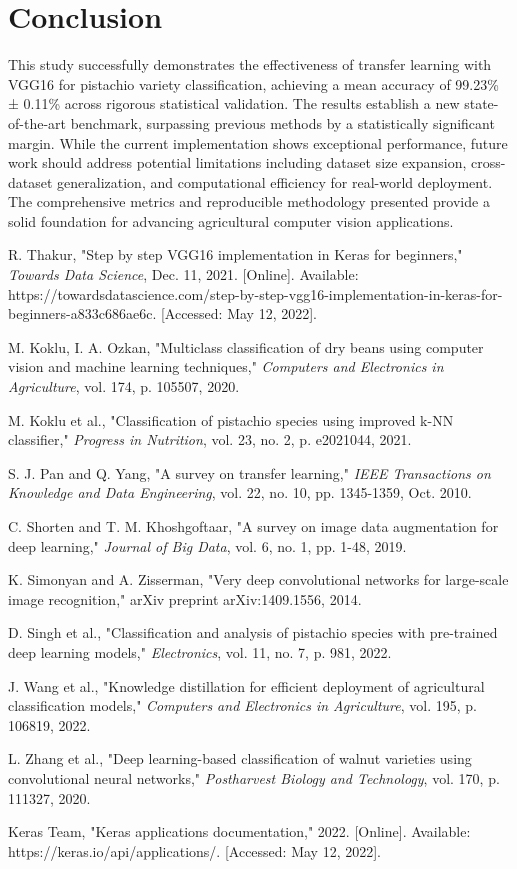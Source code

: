 \documentclass[conference]{IEEEtran}
\begin{document}
\section{Conclusion}
This study successfully demonstrates the effectiveness of transfer learning with VGG16 for pistachio variety classification, achieving a mean accuracy of 99.23\% ± 0.11\% across rigorous statistical validation. The results establish a new state-of-the-art benchmark, surpassing previous methods by a statistically significant margin. While the current implementation shows exceptional performance, future work should address potential limitations including dataset size expansion, cross-dataset generalization, and computational efficiency for real-world deployment. The comprehensive metrics and reproducible methodology presented provide a solid foundation for advancing agricultural computer vision applications.


\begin{thebibliography}{00}
 R. Thakur, "Step by step VGG16 implementation in Keras for beginners," \textit{Towards Data Science}, Dec. 11, 2021. [Online]. Available: https://towardsdatascience.com/step-by-step-vgg16-implementation-in-keras-for-beginners-a833c686ae6c. [Accessed: May 12, 2022].

 M. Koklu, I. A. Ozkan, "Multiclass classification of dry beans using computer vision and machine learning techniques," \textit{Computers and Electronics in Agriculture}, vol. 174, p. 105507, 2020.

 M. Koklu et al., "Classification of pistachio species using improved k-NN classifier," \textit{Progress in Nutrition}, vol. 23, no. 2, p. e2021044, 2021.

 S. J. Pan and Q. Yang, "A survey on transfer learning," \textit{IEEE Transactions on Knowledge and Data Engineering}, vol. 22, no. 10, pp. 1345-1359, Oct. 2010.

 C. Shorten and T. M. Khoshgoftaar, "A survey on image data augmentation for deep learning," \textit{Journal of Big Data}, vol. 6, no. 1, pp. 1-48, 2019.

 K. Simonyan and A. Zisserman, "Very deep convolutional networks for large-scale image recognition," arXiv preprint arXiv:1409.1556, 2014.

 D. Singh et al., "Classification and analysis of pistachio species with pre-trained deep learning models," \textit{Electronics}, vol. 11, no. 7, p. 981, 2022.

 J. Wang et al., "Knowledge distillation for efficient deployment of agricultural classification models," \textit{Computers and Electronics in Agriculture}, vol. 195, p. 106819, 2022.

 L. Zhang et al., "Deep learning-based classification of walnut varieties using convolutional neural networks," \textit{Postharvest Biology and Technology}, vol. 170, p. 111327, 2020.

 Keras Team, "Keras applications documentation," 2022. [Online]. Available: https://keras.io/api/applications/. [Accessed: May 12, 2022].
\end{thebibliography}
\vspace{12pt}
\end{document}
